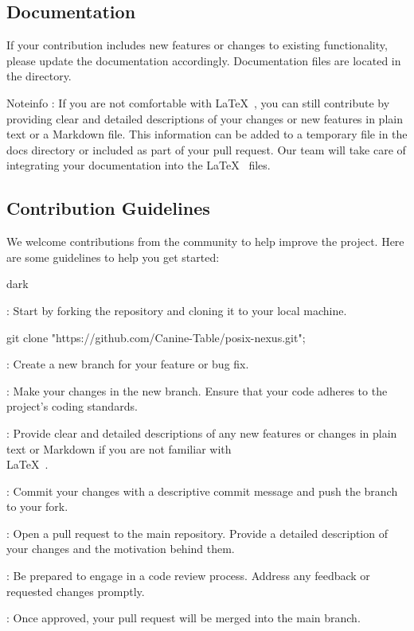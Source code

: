 \subsection{Documentation}
\label{sec:introduction:sub:document}
If your contribution includes new features or changes to existing functionality, please update the documentation accordingly.
Documentation files are located in the  directory.
\bigskip
\begin{baseBoxThree}{Note}{info}
    : If you are not comfortable with \LaTeX~, you can still contribute by providing clear and detailed descriptions of your changes or new features in plain text or a Markdown file. This information can be added to a temporary file in the docs directory or included as part of your pull request. Our team will take care of integrating your documentation into the \LaTeX~ files.\smallskip
\end{baseBoxThree}

\subsection{Contribution Guidelines}
\label{sec:introduction:sub:guidelines}
We welcome contributions from the community to help improve the project. Here are some guidelines to help you get started:
\bigskip
\begin{baseBoxOne}{}{dark}
    \begin{posnexItemize}
        \item[\sA] : Start by forking the repository and cloning it to your local machine.
        \begin{posnex}
            git clone "https://github.com/Canine-Table/posix-nexus.git";
        \end{posnex}
        \item[\sA] : Create a new branch for your feature or bug fix.
        \item[\sA] : Make your changes in the new branch. Ensure that your code adheres to the project's coding standards.
        \item[\sA] : Provide clear and detailed descriptions of any new features or changes in plain text or Markdown if you are not familiar with \\LaTeX~.
        \item[\sA] : Commit your changes with a descriptive commit message and push the branch to your fork.
        \item[\sA] : Open a pull request to the main repository. Provide a detailed description of your changes and the motivation behind them.
        \item[\sA] : Be prepared to engage in a code review process. Address any feedback or requested changes promptly.
        \item[\sA] : Once approved, your pull request will be merged into the main branch.
    \end{posnexItemize}
\end{baseBoxOne}

